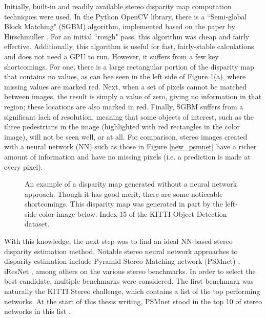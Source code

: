 Initially, built-in and readily available stereo disparity map computation techniques were used. In the Python OpenCV library, there is a ``Semi-global Block Matching" (SGBM) algorithm, implemented based on the paper by Hirschmuller \cite{hirschmuller_stereo_2007}. For an initial ``rough" pass, this algorithm was cheap and fairly effective. Additionally, this algorithm is useful for fast, fairly-stable calculations and does not need a GPU to run. However, it suffers from a few key shortcomings. For one, there is a large rectangular portion of the disparity map that contains no values, as can bee seen in the left side of Figure \ref{ind15_SGBM_comparison}(a), where missing values are marked red. Next, when a set of pixels cannot be matched between images, the result is simply a value of zero, giving no information in that region; these locations are also marked in red. Finally, SGBM suffers from a significant lack of resolution, meaning that some objects of interest, such as the three pedestrians in the image (highlighted with red rectangles in the color image), will not be seen well, or at all. For comparison, stereo images created with a neural network (NN) such as those in Figure \ref{new_psmnet} have a richer amount of information and have no missing pixels (i.e. a prediction is made at every pixel).

\begin{figure}[H]
    \centering
    \caption{An example of a disparity map generated without a neural network approach. Though it has good merit, there are some noticeable shortcomings. This disparity map was generated in part by the left-side color image below. Index 15 of the KITTI Object Detection dataset.}
    \label{ind15_SGBM_comparison}
\end{figure}

With this knowledge, the next step was to find an ideal NN-based stereo disparity estimation method. Notable stereo neural network approaches to disparity estimation include Pyramid Stereo Matching network (PSMnet) \cite{chang_pyramid_2018},  iResNet \cite{liang_learning_2018}, among others on the various stereo benchmarks. In order to select the best candidate, multiple benchmarks were considered. The first benchmark was naturally the KITTI Stereo challenge, which contains a list of the top performing networks. At the start of this thesis writing, PSMnet stood in the top 10 of stereo networks in this list \cite{menze_kitti_2019}.

